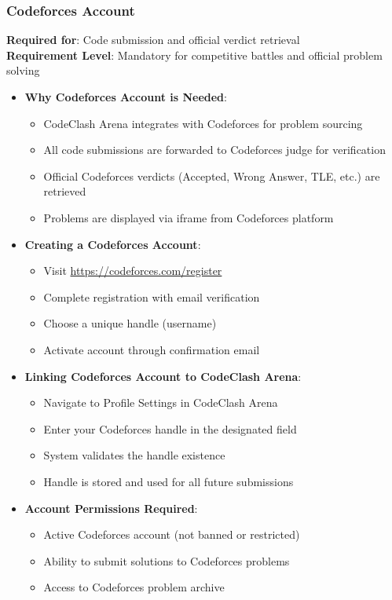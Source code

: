 \documentclass[12pt,a4paper]{article}
\begin{document}
\subsubsection{Codeforces Account}

\textbf{Required for}: Code submission and official verdict retrieval\\
\textbf{Requirement Level}: Mandatory for competitive battles and official problem solving

\begin{itemize}[leftmargin=*]
\item \textbf{Why Codeforces Account is Needed}:
  \begin{itemize}
    \item CodeClash Arena integrates with Codeforces for problem sourcing
    \item All code submissions are forwarded to Codeforces judge for verification
    \item Official Codeforces verdicts (Accepted, Wrong Answer, TLE, etc.) are retrieved
    \item Problems are displayed via iframe from Codeforces platform
  \end{itemize}
\item \textbf{Creating a Codeforces Account}:
  \begin{itemize}
    \item Visit \url{https://codeforces.com/register}
    \item Complete registration with email verification
    \item Choose a unique handle (username)
    \item Activate account through confirmation email
  \end{itemize}
\item \textbf{Linking Codeforces Account to CodeClash Arena}:
  \begin{itemize}
    \item Navigate to Profile Settings in CodeClash Arena
    \item Enter your Codeforces handle in the designated field
    \item System validates the handle existence
    \item Handle is stored and used for all future submissions
  \end{itemize}
\item \textbf{Account Permissions Required}:
  \begin{itemize}
    \item Active Codeforces account (not banned or restricted)
    \item Ability to submit solutions to Codeforces problems
    \item Access to Codeforces problem archive
  \end{itemize}
\end{itemize}
\end{document}
